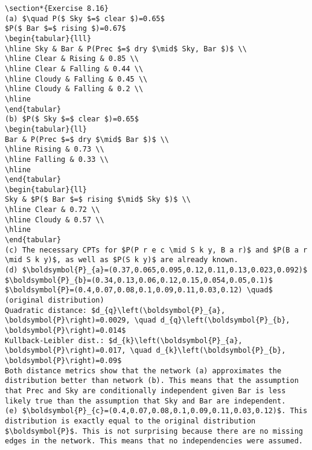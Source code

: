 \documentclass[10pt]{article}
\begin{document}
\begin{verbatim}
\section*{Exercise 8.16}
(a) $\quad P($ Sky $=$ clear $)=0.65$
$P($ Bar $=$ rising $)=0.67$
\begin{tabular}{lll}
\hline Sky & Bar & P(Prec $=$ dry $\mid$ Sky, Bar $)$ \\
\hline Clear & Rising & 0.85 \\
\hline Clear & Falling & 0.44 \\
\hline Cloudy & Falling & 0.45 \\
\hline Cloudy & Falling & 0.2 \\
\hline
\end{tabular}
(b) $P($ Sky $=$ clear $)=0.65$
\begin{tabular}{ll} 
Bar & P(Prec $=$ dry $\mid$ Bar $)$ \\
\hline Rising & 0.73 \\
\hline Falling & 0.33 \\
\hline
\end{tabular}
\begin{tabular}{ll} 
Sky & $P($ Bar $=$ rising $\mid$ Sky $)$ \\
\hline Clear & 0.72 \\
\hline Cloudy & 0.57 \\
\hline
\end{tabular}
(c) The necessary CPTs for $P(P r e c \mid S k y, B a r)$ and $P(B a r \mid S k y)$, as well as $P(S k y)$ are already known.
(d) $\boldsymbol{P}_{a}=(0.37,0.065,0.095,0.12,0.11,0.13,0.023,0.092)$
$\boldsymbol{P}_{b}=(0.34,0.13,0.06,0.12,0.15,0.054,0.05,0.1)$
$\boldsymbol{P}=(0.4,0.07,0.08,0.1,0.09,0.11,0.03,0.12) \quad$ (original distribution)
Quadratic distance: $d_{q}\left(\boldsymbol{P}_{a}, \boldsymbol{P}\right)=0.0029, \quad d_{q}\left(\boldsymbol{P}_{b}, \boldsymbol{P}\right)=0.014$
Kullback-Leibler dist.: $d_{k}\left(\boldsymbol{P}_{a}, \boldsymbol{P}\right)=0.017, \quad d_{k}\left(\boldsymbol{P}_{b}, \boldsymbol{P}\right)=0.09$
Both distance metrics show that the network (a) approximates the distribution better than network (b). This means that the assumption that Prec and Sky are conditionally independent given Bar is less likely true than the assumption that Sky and Bar are independent.
(e) $\boldsymbol{P}_{c}=(0.4,0.07,0.08,0.1,0.09,0.11,0.03,0.12)$. This distribution is exactly equal to the original distribution $\boldsymbol{P}$. This is not surprising because there are no missing edges in the network. This means that no independencies were assumed.


\end{verbatim}
\end{document}
